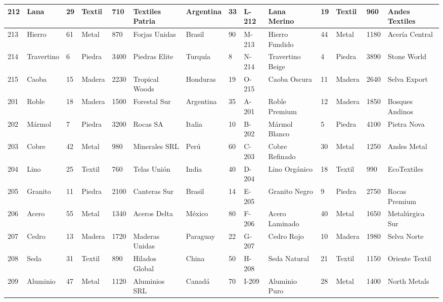 \documentclass{article}
\begin{document}
\begin{minipage}[c][\textheight][c]{\dimexpr\textwidth+\marginparsep+\marginparwidth\relax}
{\begin{minipage}[c]{\linewidth}
{\begin{tabular}{@{}llllllllllllll@{}}
    \midrule
    212 & Lana & 29 & Textil & 710 & Textiles Patria & Argentina & 33 & L-212 & Lana Merino & 19 & Textil & 960 & Andes Textiles \\
    \midrule
    213 & Hierro & 61 & Metal & 870 & Forjas Unidas & Brasil & 90 & M-213 & Hierro Fundido & 44 & Metal & 1180 & Acería Central \\
    \midrule
    214 & Travertino & 6 & Piedra & 3400 & Piedras Elite & Turquía & 8 & N-214 & Travertino Beige & 4 & Piedra & 3890 & Stone World \\
    \midrule
    215 & Caoba & 15 & Madera & 2230 & Tropical Woods & Honduras & 19 & O-215 & Caoba Oscura & 11 & Madera & 2640 & Selva Export \\
    \midrule
    201 & Roble & 18 & Madera & 1500 & Forestal Sur & Argentina & 35 & A-201 & Roble Premium & 12 & Madera & 1850 & Bosques Andinos \\
    \midrule
    202 & Mármol & 7 & Piedra & 3200 & Rocas SA & Italia & 10 & B-202 & Mármol Blanco & 5 & Piedra & 4100 & Pietra Nova \\
    \midrule
    203 & Cobre & 42 & Metal & 980 & Minerales SRL & Perú & 60 & C-203 & Cobre Refinado & 30 & Metal & 1250 & Andes Metal \\
    \midrule
    204 & Lino & 25 & Textil & 760 & Telas Unión & India & 40 & D-204 & Lino Orgánico & 18 & Textil & 990 & EcoTextiles \\
    \midrule
    205 & Granito & 11 & Piedra & 2100 & Canteras Sur & Brasil & 14 & E-205 & Granito Negro & 9 & Piedra & 2750 & Rocas Premium \\
    \midrule
    206 & Acero & 55 & Metal & 1340 & Aceros Delta & México & 80 & F-206 & Acero Laminado & 40 & Metal & 1650 & Metalúrgica Sur \\
    \midrule
    207 & Cedro & 13 & Madera & 1720 & Maderas Unidas & Paraguay & 22 & G-207 & Cedro Rojo & 10 & Madera & 1980 & Selva Norte \\
    \midrule
    208 & Seda & 31 & Textil & 890 & Hilados Global & China & 50 & H-208 & Seda Natural & 21 & Textil & 1150 & Oriente Textil \\
    \midrule
    209 & Aluminio & 47 & Metal & 1120 & Aluminios SRL & Canadá & 70 & I-209 & Aluminio Puro & 28 & Metal & 1400 & North Metals \\
    \bottomrule
  \end{tabular}
  }%
  \label{tbl-rotado}
  \vspace{\intextsep}
  \end{minipage}%
}%
\end{minipage}%
\clearpage
\end{document}
